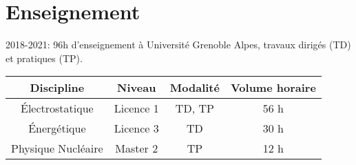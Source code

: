 \section{Enseignement}\label{teaching}

2018-2021: 96h d'enseignement à Université Grenoble Alpes, travaux dirigés (TD) et pratiques (TP).

\vspace{15pt}
\begin{table}[H]
    \centering
    \small
    {\def\arraystretch{1.}\tabcolsep=20pt
    \begin{tabular}{c c c c}
    \toprule
    \textbf{Discipline} & \textbf{Niveau} & \textbf{Modalité} & \textbf{Volume horaire} \\
    \midrule
    Électrostatique     & Licence 1 & TD, TP & 56 h \\[5pt]
    Énergétique         & Licence 3 & TD     & 30 h \\[5pt]
    Physique Nucléaire  & Master 2  & TP     & 12 h  \\
    \bottomrule
    \end{tabular}}
\end{table}
\normalsize